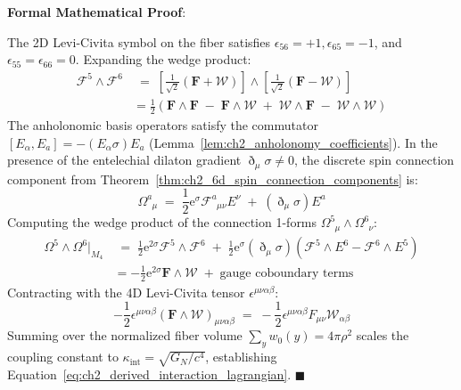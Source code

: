 \documentclass[
    12pt,
    a4paper,
    headings=normal,
    twoside=false,
    open=any,
    parskip=half
]{scrbook}
\newcommand{\ethop}{\eth}
\newcommand{\eu}{\mathrm{e}}
\newenvironment{myproof}[1][]{%
  \par\vspace{6pt}\noindent\textbf{\sffamily\color{maincolor}Formal Mathematical Proof\ifstrempty{#1}{}{ (#1)}}:\par\nopagebreak
}{%
  \penalty50\hfill\ensuremath{\blacksquare}\par\vspace{6pt}
}
\begin{document}
\begin{myproof}
The 2D Levi-Civita symbol on the fiber satisfies $\epsilon_{56} = +1, \epsilon_{65} = -1$, and $\epsilon_{55} = \epsilon_{66} = 0$. 
Expanding the wedge product:
\begin{align*}
\mathcal{F}^5 \wedge \mathcal{F}^6 &\;=\; \left[ \frac{1}{\sqrt{2}}\left( \mathbf{F} + \boldsymbol{\mathcal{W}} \right) \right] \wedge \left[ \frac{1}{\sqrt{2}}\left( \mathbf{F} - \boldsymbol{\mathcal{W}} \right) \right] \\
&= \frac{1}{2} \left( \mathbf{F} \wedge \mathbf{F} \;-\; \mathbf{F} \wedge \boldsymbol{\mathcal{W}} \;+\; \boldsymbol{\mathcal{W}} \wedge \mathbf{F} \;-\; \boldsymbol{\mathcal{W}} \wedge \boldsymbol{\mathcal{W}} \right)
\end{align*}
The anholonomic basis operators satisfy the commutator $[E_\alpha, E_a] = -(E_\alpha\sigma)E_a$ (Lemma~\ref{lem:ch2_anholonomy_coefficients}). In the presence of the entelechial dilaton gradient $\ethop_\mu\sigma \ne 0$, the discrete spin connection component from Theorem~\ref{thm:ch2_6d_spin_connection_components} is:
\begin{equation*}
\Omega^a_{\phantom{a}\mu} \;=\; \frac{1}{2}\eu^\sigma \mathcal{F}^a_{\phantom{a}\mu\nu} E^\nu \;+\; (\ethop_\mu\sigma) E^a
\end{equation*}
Computing the wedge product of the connection 1-forms $\Omega^5_{\phantom{5}\mu} \wedge \Omega^6_{\phantom{6}\nu}$:
\begin{align*}
\Omega^5 \wedge \Omega^6 \Big|_{M_4} &\;=\; \frac{1}{2}\eu^{2\sigma} \mathcal{F}^5 \wedge \mathcal{F}^6 \;+\; \frac{1}{2}\eu^\sigma (\ethop_\mu\sigma) \left( \mathcal{F}^5 \wedge E^6 - \mathcal{F}^6 \wedge E^5 \right) \\
&= -\frac{1}{2}\eu^{2\sigma} \mathbf{F} \wedge \boldsymbol{\mathcal{W}} \;+\; \text{gauge coboundary terms}
\end{align*}
Contracting with the 4D Levi-Civita tensor $\epsilon^{\mu\nu\alpha\beta}$:
\begin{equation*}
-\frac{1}{2} \epsilon^{\mu\nu\alpha\beta} (\mathbf{F} \wedge \boldsymbol{\mathcal{W}})_{\mu\nu\alpha\beta} \;=\; -\frac{1}{2} \epsilon^{\mu\nu\alpha\beta} F_{\mu\nu} \mathcal{W}_{\alpha\beta}
\end{equation*}
Summing over the normalized fiber volume $\sum_{y} w_0(y) = 4\pi\rho^2$ scales the coupling constant to $\kappa_{\text{int}} = \sqrt{G_N / c^4}$, establishing Equation~\eqref{eq:ch2_derived_interaction_lagrangian}.
\end{myproof}
\end{document}
